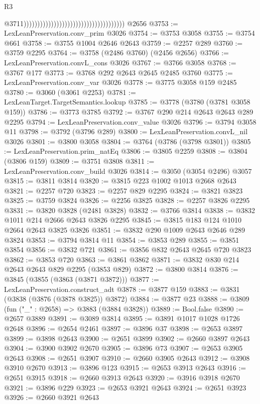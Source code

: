 \begin{lexlean}{R3}
\begin{coremodule}
                                                                              @3711)))))))))))))))))))))))))))))))))))))
    @2656
@3753 := LexLeanPreservation.conv_prim @3026
@3754 := @3753 @3058
@3755 := @3754 @661
@3758 := @3755 @1004 @2646 @2643
@3759 := @2257 @289
@3760 := @3759 @2295
@3764 := @3758 (@2486 @3760) (@2456 @2656)
@3766 := LexLeanPreservation.convL_cons @3026
@3767 := @3766 @3058
@3768 := @3767 @177
@3773 := @3768 @292 @2643 @2645 @2485 @3760
@3775 := LexLeanPreservation.conv_var @3026
@3778 := @3775 @3058 @159 @2485
@3780 := @3060 (@3061 @2253)
@3781 := LexLeanTarget.TargetSemantics.lookup
@3785 := @3778 (@3780 (@3781 @3058 @159))
@3786 := @3773 @3785
@3792 := @3767 @290 @214 @2643 @2643 @289 @2295
@3794 := LexLeanPreservation.conv_value @3026
@3796 := @3794 @3058 @11
@3798 := @3792 (@3796 @289)
@3800 := LexLeanPreservation.convL_nil @3026
@3801 := @3800 @3058
@3804 := @3764 (@3786 (@3798 @3801))
@3805 := LexLeanPreservation.prim_natEq
@3806 := @3805 @2259
@3808 := @3804 (@3806 @159)
@3809 := @3751 @3808
@3811 := LexLeanPreservation.conv_build @3026
@3814 := @3050 (@3054 @2496) @3057
@3815 := @3811 @3814
@3820 := @3815 @223 @1002 @1013 @2668 @2643
@3821 := @2257 @720
@3823 := @2257 @829 @2295
@3824 := @3821 @3823
@3825 := @3759 @3824
@3826 := @2256 @3825
@3828 := @2257 @3826 @2295
@3831 := @3820 @3828 (@2481 @3828)
@3832 := @3766 @3814
@3838 := @3832 @1011 @214 @2666 @2643 @3826 @2295
@3845 := @3815 @183 @124 @1010 @2664 @2643 @3825 @3826
@3851 := @3832 @290 @1009 @2643 @2646 @289 @3824
@3853 := @3794 @3814 @11
@3854 := @3853 @289
@3855 := @3851 @3854
@3856 := @3832 @721
@3861 := @3856 @832 @2643 @2645 @720 @3823
@3862 := @3853 @720
@3863 := @3861 @3862
@3871 := @3832 @830 @214 @2643 @2643 @829 @2295 (@3853 @829)
@3872 := @3800 @3814
@3876 := @3845 (@3855 (@3863 (@3871 @3872)))
@3877 := LexLeanPreservation.construct_adt
@3878 := @3877 @159
@3883 := @3831 (@3838 (@3876 (@3878 @3825)) @3872)
@3884 := @3877 @23
@3888 := @3809 (fun ("_" : @2658) => @3883 (@3884 @3828))
@3889 := Bool.false
@3890 := @2657 @3889
@3891 := @3089 @3814
@3895 := @3891 @1017 @1028 @1726 @2648
@3896 := @2654 @2461
@3897 := @3896 @37
@3898 := @2653 @3897
@3899 := @3898 @2643
@3900 := @2651 @3899
@3902 := @2660 @3897 @2643
@3904 := @3900 @3902 @2670
@3905 := @3896 @73
@3907 := @2653 @3905 @2643
@3908 := @2651 @3907
@3910 := @2660 @3905 @2643
@3912 := @3908 @3910 @2670
@3913 := @3896 @123
@3915 := @2653 @3913 @2643
@3916 := @2651 @3915
@3918 := @2660 @3913 @2643
@3920 := @3916 @3918 @2670
@3921 := @3896 @229
@3923 := @2653 @3921 @2643
@3924 := @2651 @3923
@3926 := @2660 @3921 @2643

\end{coremodule}
\end{lexlean}
